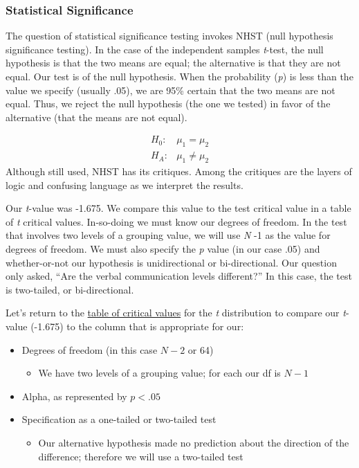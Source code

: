 \documentclass[
  11pt,
]{book}
\providecommand{\tightlist}{%
  \setlength{\itemsep}{0pt}\setlength{\parskip}{0pt}}
\begin{document}
\hypertarget{statistical-significance-1}{%
\subsubsection{Statistical Significance}\label{statistical-significance-1}}

The question of statistical significance testing invokes NHST (null hypothesis significance testing). In the case of the independent samples \emph{t}-test, the null hypothesis is that the two means are equal; the alternative is that they are not equal. Our test is of the null hypothesis. When the probability (\emph{p}) is less than the value we specify (usually .05), we are 95\% certain that the two means are not equal. Thus, we reject the null hypothesis (the one we tested) in favor of the alternative (that the means are not equal).

\[
\begin{array}{ll}
H_0: & \mu_1 = \mu_2  \\
H_A: & \mu_1 \neq \mu_2
\end{array}
\]
Although still used, NHST has its critiques. Among the critiques are the layers of logic and confusing language as we interpret the results.

Our \emph{t}-value was -1.675. We compare this value to the test critical value in a table of \emph{t} critical values. In-so-doing we must know our degrees of freedom. In the test that involves two levels of a grouping value, we will use \emph{N} -1 as the value for degrees of freedom. We must also specify the \emph{p} value (in our case .05) and whether-or-not our hypothesis is unidirectional or bi-directional. Our question only asked, ``Are the verbal communication levels different?'' In this case, the test is two-tailed, or bi-directional.

Let's return to the \href{https://www.statology.org/t-distribution-table/}{table of critical values} for the \emph{t} distribution to compare our \emph{t}-value (-1.675) to the column that is appropriate for our:

\begin{itemize}
\tightlist
\item
  Degrees of freedom (in this case \(N-2\) or 64)

  \begin{itemize}
  \tightlist
  \item
    We have two levels of a grouping value; for each our df is \(N-1\)
  \end{itemize}
\item
  Alpha, as represented by \(p < .05\)
\item
  Specification as a one-tailed or two-tailed test

  \begin{itemize}
  \tightlist
  \item
    Our alternative hypothesis made no prediction about the direction of the difference; therefore we will use a two-tailed test
  \end{itemize}
\end{itemize}
\end{document}
